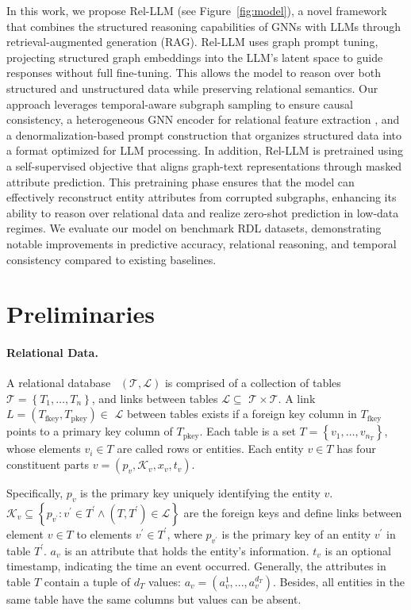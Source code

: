 \documentclass[11pt]{article}
\begin{document}
In this work, we propose Rel-LLM (see Figure~\ref{fig:model}), a novel framework that combines the structured reasoning capabilities of GNNs with LLMs through retrieval-augmented generation (RAG). 
Rel-LLM uses graph prompt tuning, projecting structured graph embeddings into the LLM’s latent space to guide responses without full fine-tuning. This allows the model to reason over both structured and unstructured data while preserving relational semantics.
Our approach leverages temporal-aware subgraph sampling to ensure causal consistency, a heterogeneous GNN encoder for relational feature extraction \cite{fey2023relational, robinson2024relbench}, and a denormalization-based prompt construction that organizes structured data into a format optimized for LLM processing. 
In addition, Rel-LLM is pretrained using a self-supervised objective that aligns graph-text representations through masked attribute prediction. This pretraining phase ensures that the model can effectively reconstruct entity attributes from corrupted subgraphs, enhancing its ability to reason over relational data and realize zero-shot prediction in low-data regimes.
We evaluate our model on benchmark RDL datasets, demonstrating notable improvements in predictive accuracy, relational reasoning, and temporal consistency compared to existing baselines.

\section{Preliminaries}
\paragraph{Relational Data.}
A relational database~\citep{feyposition} $(\mathcal{T}, \mathcal{L})$ is comprised of a collection of tables $\mathcal{T}=\left\{T_1, \ldots, T_n\right\}$, and links between tables $\mathcal{L} \subseteq$ $\mathcal{T} \times \mathcal{T}$. A link $L=\left(T_{\text{fkey}}, T_{\text{pkey}}\right) \in$ $\mathcal{L}$ between tables exists if a foreign key column in $T_{\text{fkey}}$ points to a primary key column of $T_{\text{pkey}}$. Each table is a set $T=\left\{v_1, \ldots, v_{n_T}\right\}$, whose elements $v_i \in T$ are called rows or entities. Each entity $v \in T$ has four constituent parts $v=\left(p_v, \mathcal{K}_v, x_v, t_v\right)$.

Specifically, $p_v$ is the primary key uniquely identifying the entity $v$. $\mathcal{K}_v \subseteq\left\{p_{v^{\prime}}: v^{\prime} \in T^{\prime} \wedge \left(T, T^{\prime}\right) \in \mathcal{L}\right\}$ are the foreign keys and define links between element $v \in T$ to elements $v^{\prime} \in T^{\prime}$, where $p_{v^{\prime}}$ is the primary key of an entity $v^{\prime}$ in table $T^{\prime}$. $a_v$ is an attribute that holds the entity's information. $t_v$ is an optional timestamp, indicating the time an event occurred. Generally, the attributes in table $T$ contain a tuple of $d_T$ values: $a_v=(a_v^1,...,a_v^{d_T})$. Besides, all entities in the same table have the same columns but values can be absent. 
\end{document}
